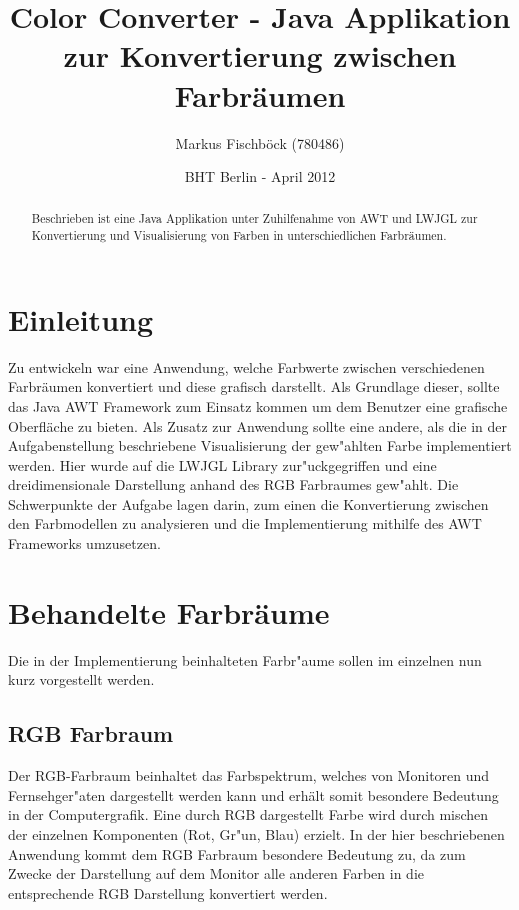 \documentclass[a4paper]{article}
\title{Color Converter - Java Applikation zur Konvertierung zwischen Farbr\"aumen}
\author{Markus Fischb\"ock (780486)}
\date{BHT Berlin - April 2012}
\begin{document}
\maketitle
\begin{abstract}
Beschrieben ist eine Java Applikation unter Zuhilfenahme von AWT und LWJGL zur Konvertierung und Visualisierung von Farben in unterschiedlichen Farbr\"aumen.
\end{abstract}


\newpage
\tableofcontents
\newpage

\section{Einleitung}
Zu entwickeln war eine Anwendung, welche Farbwerte zwischen verschiedenen Farbr\"aumen konvertiert und
diese grafisch darstellt. Als Grundlage dieser, sollte das Java AWT Framework zum Einsatz kommen um dem
Benutzer eine grafische Oberfl\"ache zu bieten. Als Zusatz zur Anwendung sollte eine andere, als die in
der Aufgabenstellung beschriebene Visualisierung der gew"ahlten Farbe implementiert werden. Hier wurde
auf die LWJGL Library zur"uckgegriffen und eine dreidimensionale Darstellung anhand des RGB Farbraumes
gew"ahlt.\newline
Die Schwerpunkte der Aufgabe lagen darin, zum einen die Konvertierung zwischen den Farbmodellen zu
analysieren und die Implementierung mithilfe des AWT Frameworks umzusetzen.


\section{Behandelte Farbr\"aume}
Die in der Implementierung beinhalteten Farbr"aume sollen im einzelnen nun kurz vorgestellt werden.
\newline
\subsection{RGB Farbraum}
Der RGB-Farbraum beinhaltet das Farbspektrum, welches von Monitoren und Fernsehger"aten dargestellt werden
kann und erh\"alt somit besondere Bedeutung in der Computergrafik. Eine durch RGB dargestellt Farbe wird durch mischen der
einzelnen Komponenten (Rot, Gr"un, Blau) erzielt. In der hier beschriebenen Anwendung kommt dem RGB Farbraum
besondere Bedeutung zu, da zum Zwecke der Darstellung auf dem Monitor alle anderen Farben in die entsprechende RGB
Darstellung konvertiert werden.
\end{document}
